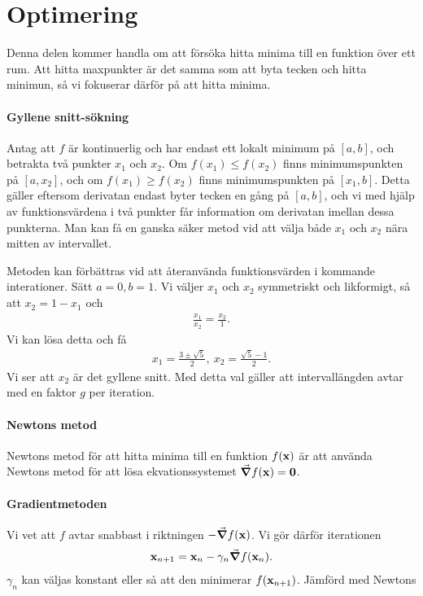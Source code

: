 \section{Optimering}
Denna delen kommer handla om att försöka hitta minima till en funktion över ett rum. Att hitta maxpunkter är det samma som att byta tecken och hitta minimun, så vi fokuserar därför på att hitta minima.

\paragraph{Gyllene snitt-sökning}
Antag att $f$ är kontinuerlig och har endast ett lokalt minimum på $[a, b]$, och betrakta två punkter $x_{1}$ och $x_{2}$. Om $f(x_{1}) \leq f(x_{2})$ finns minimumspunkten på $[a, x_{2}]$, och om $f(x_{1}) \geq f(x_{2})$ finns minimumspunkten på $[x_{1}, b]$. Detta gäller eftersom derivatan endast byter tecken en gång på $[a, b]$, och vi med hjälp av funktionsvärdena i två punkter får information om derivatan imellan dessa punkterna. Man kan få en ganska säker metod vid att välja både $x_{1}$ och $x_{2}$ nära mitten av intervallet.

Metoden kan förbättras vid att återanvända funktionsvärden i kommande interationer. Sätt $a = 0, b = 1$. Vi väljer $x_{1}$ och $x_{2}$ symmetriskt och likformigt, så att $x_{2} = 1 - x_{1}$ och
\begin{align*}
	\frac{x_{1}}{x_{2}} = \frac{x_{2}}{1}.
\end{align*}
Vi kan lösa detta och få
\begin{align*}
	x_{1} = \frac{3 \pm \sqrt{5}}{2},\ x_{2} = \frac{\sqrt{5} - 1}{2}.
\end{align*}
Vi ser att $x_{2}$ är det gyllene snitt. Med detta val gäller att intervallängden avtar med en faktor $g$ per iteration.

\paragraph{Newtons metod}
Newtons metod för att hitta minima till en funktion $f(\vb{x})$ är att använda Newtons metod för att lösa ekvationssystemet $\grad{f}(\vb{x}) = \vb{0}$.

\paragraph{Gradientmetoden}
Vi vet att $f$ avtar snabbast i riktningen $-\grad{f}(\vb{x})$. Vi gör därför iterationen
\begin{align*}
	\vb{x}_{n + 1} = \vb{x}_{n} - \gamma_{n}\grad{f}(\vb{x}_{n}).
\end{align*}
$\gamma_{n}$ kan väljas konstant eller så att den minimerar $f(\vb{x}_{n + 1})$. Jämförd med Newtons
